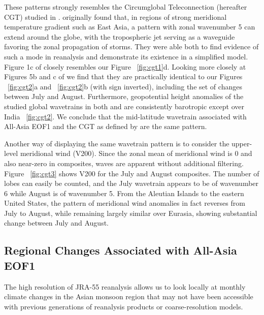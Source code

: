 	These patterns strongly resembles the Circumglobal Teleconnection (hereafter CGT) studied in \citet{Ding2005a}. \citet{Branstator2002} originally found that, in regions of strong meridional temperature gradient such as East Asia, a pattern with zonal wavenumber 5 can extend around the globe, with the tropospheric jet serving as a waveguide favoring the zonal propagation of storms. They were able both to find evidence of such a mode in reanalysis and demonstrate its existence in a simplified model. Figure 1c of \citet{Branstator2002} closely resembles our Figure ~\ref{fig:cgt1}d. Looking more closely at Figures 5b and c of \citet{Ding2005a} we find that they are practically identical to our Figures ~\ref{fig:cgt2}a and ~\ref{fig:cgt2}b (with sign inverted), including the set of changes between July and August. Furthermore, geopotential height anomalies of the studied global wavetrains in both \citet{Branstator2002} and \citet{Ding2005a} are consistently barotropic except over India ~\ref{fig:cgt2}. We conclude that the mid-latitude wavetrain associated with All-Asia EOF1 and the CGT as defined by \citet{Ding2005a} are the same pattern.
	
	Another way of displaying the same wavetrain pattern is to consider the upper-level meridional wind (V200). Since the zonal mean of meridional wind is 0 \citep{Ding2007} and also near-zero in composites, waves are apparent without additional filtering. Figure ~\ref{fig:cgt3} shows V200 for the July and August composites. The number of lobes can easily be counted, and the July wavetrain appears to be of wavenumber 6 while August is of wavenumber 5. From the Aleutian Islands to the eastern United States, the pattern of meridional wind anomalies in fact reverses from July to August, while remaining largely similar over Eurasia, showing substantial change between July and August.
		
\subsection{Regional Changes Associated with All-Asia EOF1}

	The high resolution of JRA-55 reanalysis allows us to look locally at monthly climate changes in the Asian monsoon region that may not have been accessible with previous generations of reanalysis products or coarse-resolution models.
	
